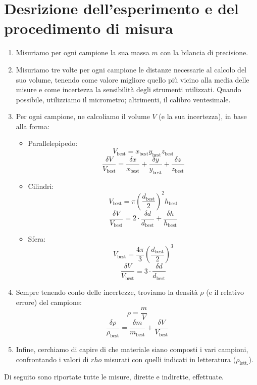 \documentclass{article}
\begin{document}
\section{Desrizione dell'esperimento e del procedimento di misura}
\begin{enumerate}
    \item Misuriamo per ogni campione la sua massa $m$ con la bilancia di precisione.
    \item Misuriamo tre volte per ogni campione le distanze necessarie al calcolo
          del suo volume, tenendo come valore migliore quello più vicino alla media
          delle misure e come incertezza la sensibilità degli strumenti utilizzati.
          Quando possibile, utilizziamo il micrometro; altrimenti, il calibro ventesimale.
    \item Per ogni campione, ne calcoliamo il volume $V$ (e la sua incertezza), in base alla forma:
    \begin{itemize}
        \item Parallelepipedo:
            \[V_\text{best} = x_\text{best} y_\text{best} z_\text{best}\]
            \[
                \frac{\delta V}{V_\text{best}} = \frac{\delta x}{x_\text{best}} + \frac{\delta y}{y_\text{best}} + \frac{\delta z}{z_\text{best}}
            \]
        \item Cilindri:
            \[V_\text{best} = \pi \left(\frac{d_\text{best}}{2}\right)^2 h_\text{best}\]
            \[
                \frac{\delta V}{V_\text{best}} = 2 \cdot \frac{\delta d}{d_\text{best}} + \frac{\delta h}{h_\text{best}}
            \]
        \item Sfera:
            \[V_\text{best} = \frac{4 \pi}{3} \left(\frac{d_\text{best}}{2}\right)^3\]
            \[
                \frac{\delta V}{V_\text{best}} = 3 \cdot \frac{\delta d}{d_\text{best}}
            \]
    \end{itemize}
    \item Sempre tenendo conto delle incertezze, troviamo la densità $\rho$ (e il relativo errore) del campione:
        \[\rho = \frac{m}{V}\]
        \[\frac{\delta \rho}{\rho_\text{best}} = \frac{\delta m}{m_\text{best}} + \frac{\delta V}{V_\text{best}}\]
    \item Infine, cerchiamo di capire di che materiale siano composti i vari campioni, confrontando
    i valori di $rho$ misurati con quelli indicati in letteratura ($\rho_\text{lett.}$).
\end{enumerate}

Di seguito sono riportate tutte le misure, dirette e indirette, effettuate.
\end{document}
